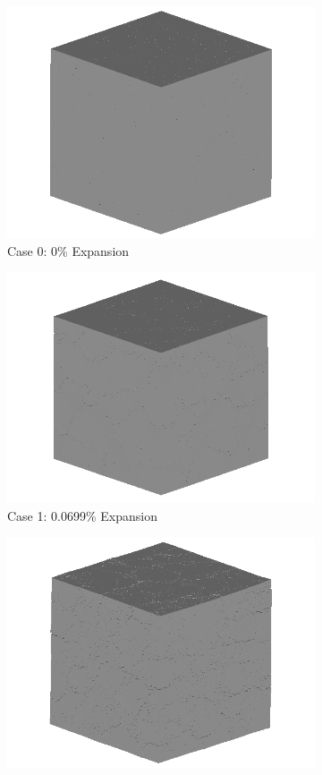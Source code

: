 \begin{figure}[!h]
\centering

    \begin{subfigure}{.5\textwidth}
      \centering
      \includegraphics[width=.8\linewidth]{Files/exp_3D/ASR/A30Undamaged.png} %
    \caption{Case 0: 0\% Expansion}
    \end{subfigure}%
    \begin{subfigure}{.5\textwidth}
      \centering
      \includegraphics[width=.8\linewidth]{Files/exp_3D/ASR/A15P75_1_3d.png}
    \caption{Case 1: 0.0699\% Expansion}
    \end{subfigure}
    \begin{subfigure}{.5\textwidth}
      \centering
      \includegraphics[width=.8\linewidth]{Files/exp_3D/ASR/A15P75_2_3d.png}

\end{subfigure}
\end{figure}
